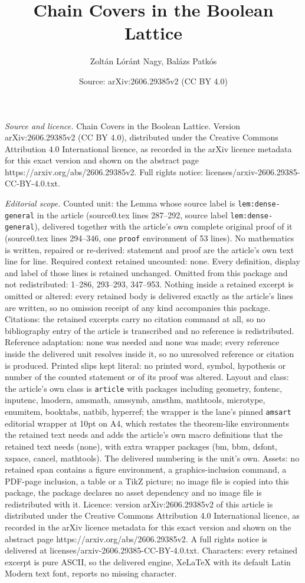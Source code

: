 \documentclass[10pt,a4paper]{amsart}
\title[Chain Covers in the Boolean Lattice]{Chain Covers in the Boolean Lattice}
\author{Zolt\'an L\'or\'ant Nagy, Bal\'azs Patk\'os}
\date{Source: arXiv:2606.29385v2 (CC BY 4.0)}
\begin{document}
\maketitle

\noindent\emph{Source and licence.} Chain Covers in the Boolean Lattice. Version arXiv:2606.29385v2 (CC BY 4.0), distributed under the Creative Commons Attribution 4.0 International licence, as recorded in the arXiv licence metadata for this exact version and shown on the abstract page https://arxiv.org/abs/2606.29385v2. Full rights notice: licenses/arxiv-2606.29385-CC-BY-4.0.txt.\par\smallskip

\noindent\textit{Editorial scope.} Counted unit: the Lemma whose source label is \texttt{lem:dense-general} in the article (source0.tex lines 287--292, source label \texttt{lem:dense-general}), delivered together with the article's own complete original proof of it (source0.tex lines 294--346, one \texttt{proof} environment of 53 lines). No mathematics is written, repaired or re-derived: statement and proof are the article's own text line for line. Required context retained uncounted: none. Every definition, display and label of those lines is retained unchanged. Omitted from this package and not redistributed: 1--286, 293--293, 347--953. Nothing inside a retained excerpt is omitted or altered: every retained body is delivered exactly as the article's lines are written, so no omission receipt of any kind accompanies this package. Citations: the retained excerpts carry no citation command at all, so no bibliography entry of the article is transcribed and no reference is redistributed. Reference adaptation: none was needed and none was made; every reference inside the delivered unit resolves inside it, so no unresolved reference or citation is produced. Printed slips kept literal: no printed word, symbol, hypothesis or number of the counted statement or of its proof was altered. Layout and class: the article's own class is \texttt{article} with packages including geometry, fontenc, inputenc, lmodern, amsmath, amssymb, amsthm, mathtools, microtype, enumitem, booktabs, natbib, hyperref; the wrapper is the lane's pinned \texttt{amsart} editorial wrapper at 10pt on A4, which restates the theorem-like environments the retained text needs and adds the article's own macro definitions that the retained text needs (none), with extra wrapper packages (bm, bbm, dsfont, xspace, cancel, mathtools). The delivered numbering is the unit's own. Assets: no retained span contains a figure environment, a graphics-inclusion command, a PDF-page inclusion, a table or a TikZ picture; no image file is copied into this package, the package declares no asset dependency and no image file is redistributed with it. Licence: version arXiv:2606.29385v2 of this article is distributed under the Creative Commons Attribution 4.0 International licence, as recorded in the arXiv licence metadata for this exact version and shown on the abstract page https://arxiv.org/abs/2606.29385v2. A full rights notice is delivered at licenses/arxiv-2606.29385-CC-BY-4.0.txt. Characters: every retained excerpt is pure ASCII, so the delivered engine, XeLaTeX with its default Latin Modern text font, reports no missing character.
\end{document}
